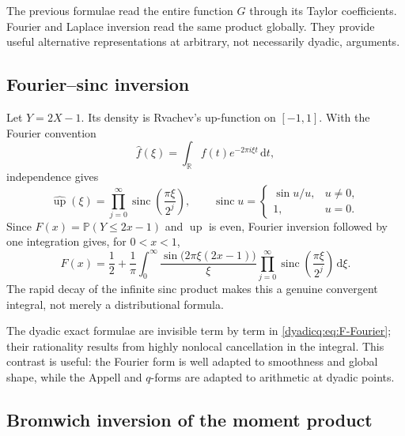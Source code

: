 \documentclass[11pt,oneside]{article}
\theoremstyle{definition}
\theoremstyle{remark}
\newcommand{\R}{\mathbb R}
\newcommand{\Up}{\operatorname{up}}
\newcommand{\sinc}{\operatorname{sinc}}
\newcommand{\dd}{\,\mathrm d}
\newcommand{\Prob}{\mathbb P}
\begin{document}
The previous formulae read the entire function $G$ through its Taylor
coefficients.  Fourier and Laplace inversion read the same product globally.
They provide useful alternative representations at arbitrary, not necessarily
dyadic, arguments.

\subsection{Fourier--sinc inversion}

Let $Y=2X-1$.  Its density is Rvachev's up-function on $[-1,1]$.  With the
Fourier convention
\[
 \widehat f(\xi)=\int_{\R}f(t)e^{-2\pi i\xi t}\dd t,
\]
independence gives
\begin{equation}\label{dyadicq:eq:up-Fourier}
 \widehat{\Up}(\xi)
 =\prod_{j=0}^{\infty}
 \sinc\!\left(\frac{\pi\xi}{2^j}\right),
 \qquad
 \sinc u=\begin{cases}\sin u/u,&u\ne0,\\1,&u=0.\end{cases}
\end{equation}
Since $F(x)=\Prob(Y\le2x-1)$ and $\Up$ is even,
Fourier inversion followed by one integration gives, for $0<x<1$,
\begin{equation}\label{dyadicq:eq:F-Fourier}
 \boxed{
 F(x)=\frac12+\frac1\pi\int_0^{\infty}
 \frac{\sin\bigl(2\pi\xi(2x-1)\bigr)}{\xi}
 \prod_{j=0}^{\infty}
 \sinc\!\left(\frac{\pi\xi}{2^j}\right)\dd\xi.}
\end{equation}
The rapid decay of the infinite sinc product makes this a genuine convergent
integral, not merely a distributional formula.

The dyadic exact formulae are invisible term by term in
\eqref{dyadicq:eq:F-Fourier}; their rationality results from highly nonlocal
cancellation in the integral.  This contrast is useful: the Fourier form is
well adapted to smoothness and global shape, while the Appell and $q$-forms are
adapted to arithmetic at dyadic points.

\subsection{Bromwich inversion of the moment product}
\end{document}
